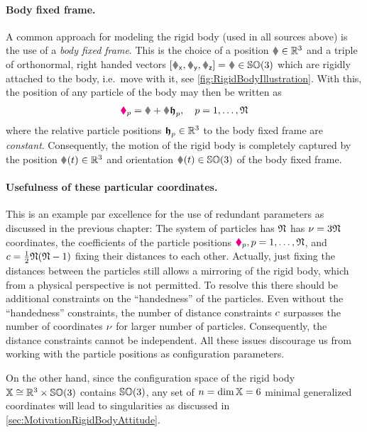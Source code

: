 \paragraph*{Body fixed frame.}
A common approach for modeling the rigid body (used in all sources above) is the use of a \textit{body fixed frame}.
This is the choice of a position $\r\in \RealNum^3$ and a triple of orthonormal, right handed vectors $[\Rx,\Ry,\Rz] = \R \in \SpecialOrthogonalGroup(3)$ which are rigidly attached to the body, i.e.\ move with it, see \autoref{fig:RigidBodyIllustration}.
With this, the position of any particle of the body may then be written as
\begin{align}\label{eq:RBParticlePos}
 \particlePos{\PidxI} = \r + \R \particleBodyPos{\PidxI}, \quad \PidxI=1,\ldots,\numParticles
\end{align}
where the relative particle positions $\boldsymbol{\mathfrak{h}}_{p} \in \mathbb{R}^3$ to the body fixed frame are \textit{constant}.
Consequently, the motion of the rigid body is completely captured by the position $\r(t) \in \RealNum^3$ and orientation $\R(t) \in \SpecialOrthogonalGroup(3)$ of the body fixed frame.

\paragraph*{Usefulness of these particular coordinates.}
This is an example par excellence for the use of redundant parameters as discussed in the previous chapter:
The system of particles has $\mathfrak{N}$ has $\nu = 3\mathfrak{N}$ coordinates, the coefficients of the particle positions $\boldsymbol{\textcolor{magenta}{\blacklozenge}}_{p}, p=1,\ldots,\mathfrak{N}$, and $c = \tfrac{1}{2} \mathfrak{N}(\mathfrak{N}-1)$ fixing their distances to each other.
Actually, just fixing the distances between the particles still allows a mirroring of the rigid body, which from a physical perspective is not permitted. 
To resolve this there should be additional constraints on the ``handedness'' of the particles.
Even without the ``handedness'' constraints, the number of distance constraints $c$ surpasses the number of coordinates $\nu$ for larger number of particles.
Consequently, the distance constraints cannot be independent.
All these issues discourage us from working with the particle positions as configuration parameters.

On the other hand, since the configuration space of the rigid body $\mathbb{X} \cong \mathbb{R}^3 \times \mathbb{SO}(3)$ contains $\mathbb{SO}(3)$, any set of $n=\dim \mathbb{X} = 6$ minimal generalized coordinates will lead to singularities as discussed in \autoref{sec:MotivationRigidBodyAttitude}.

